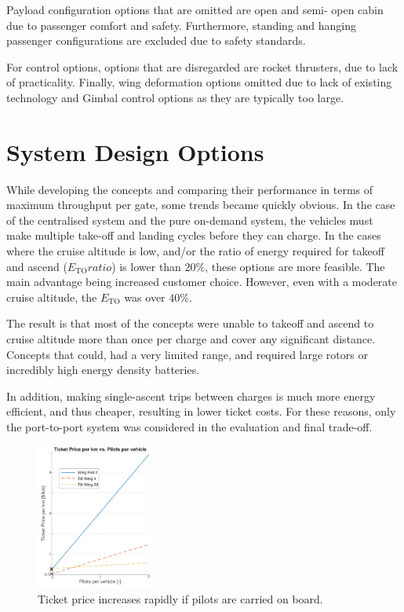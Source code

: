 Payload configuration options that are omitted are open and semi- open cabin due to passenger comfort and safety. Furthermore, standing and hanging passenger configurations are excluded due to safety standards.

For control options, options that are disregarded are rocket thrusters, due to lack of practicality. Finally, wing deformation options omitted due to lack of existing technology and Gimbal control options as they are typically too large. 

\section{System Design Options}
While developing the concepts and comparing their performance in terms of maximum throughput per gate, some trends became quickly obvious. In the case of the centralised system and the pure on-demand system, the vehicles must make multiple take-off and landing cycles before they can charge. In the cases where the cruise altitude is low, and/or the ratio of energy required for takeoff and ascend ($E_\text{TO} ratio$) is lower than 20\%, these options are more feasible. The main advantage being increased customer choice. However, even with a moderate cruise altitude, the $E_\text{TO}$ was over 40\%.

The result is that most of the concepts were unable to takeoff and ascend to cruise altitude more than once per charge and cover any significant distance. Concepts that could, had a very limited range, and required large rotors or incredibly high energy density batteries.

In addition, making single-ascent trips between charges is much more energy efficient, and thus cheaper, resulting in lower ticket costs. For these reasons, only the port-to-port system was considered in the evaluation and final trade-off.

\begin{figure}
    \centering
    \includegraphics[width=0.35\textwidth]{Figures/Pilots_TPrice_perkm.png}
    \captionsetup{justification=centering}
    \caption{Ticket price increases rapidly if pilots are carried on board.}
    \label{fig:pilotedcost}
\end{figure}

